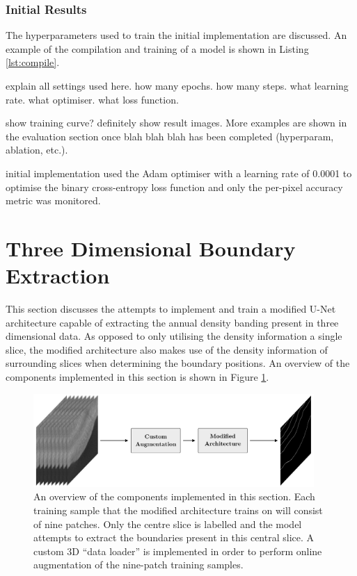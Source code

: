 \subsubsection{Initial Results}

The hyperparameters used to train the initial implementation are discussed. An example of the compilation and training of a model is shown in Listing \ref{lst:compile}.

explain all settings used here. how many epochs. how many steps. what learning rate. what optimiser. what loss function.

show training curve? definitely show result images. More examples are shown in the evaluation section once blah blah blah has been completed (hyperparam, ablation, etc.).

initial implementation used the Adam optimiser with a learning rate of 0.0001 to optimise the binary cross-entropy loss function and only the per-pixel accuracy metric was monitored.

\section{Three Dimensional Boundary Extraction}
\label{sec:threedimension}

This section discusses the attempts to implement and train a modified U-Net architecture capable of extracting the annual density banding present in three dimensional data. As opposed to only utilising the density information a single slice, the modified architecture also makes use of the density information of surrounding slices when determining the boundary positions. An overview of the components implemented in this section is shown in Figure \ref{fig:3doverview}.

\begin{figure}[t]
    \centering
    \includegraphics[width=0.95\textwidth]{images/3D-overview.pdf}
    \caption{An overview of the components implemented in this section. Each training sample that the modified architecture trains on will consist of nine patches. Only the centre slice is labelled and the model attempts to extract the boundaries present in this central slice. A custom 3D ``data loader'' is implemented in order to perform online augmentation of the nine-patch training samples.}
    \label{fig:3doverview}
\end{figure}

